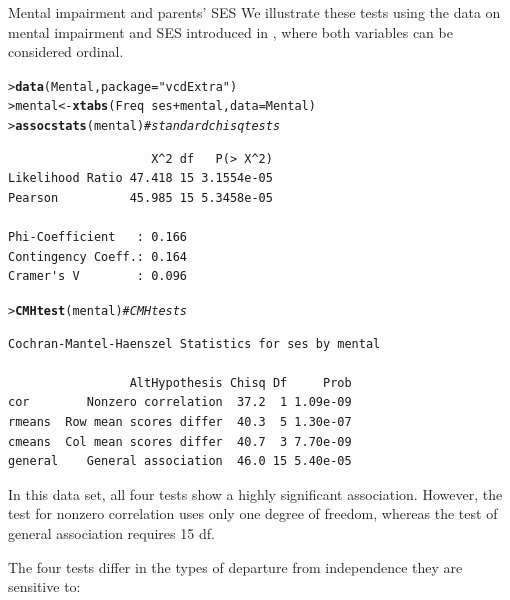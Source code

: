 \documentclass[10pt,krantz2]{krantz}\usepackage[]{graphicx}\usepackage[]{color}
\makeatletter
\newcommand{\hlstr}[1]{\textcolor[rgb]{0.192,0.494,0.8}{#1}}%
\newcommand{\hlcom}[1]{\textcolor[rgb]{0.678,0.584,0.686}{\textit{#1}}}%
\newcommand{\hlopt}[1]{\textcolor[rgb]{0,0,0}{#1}}%
\newcommand{\hlstd}[1]{\textcolor[rgb]{0.345,0.345,0.345}{#1}}%
\newcommand{\hlkwb}[1]{\textcolor[rgb]{0.69,0.353,0.396}{#1}}%
\newcommand{\hlkwc}[1]{\textcolor[rgb]{0.333,0.667,0.333}{#1}}%
\newcommand{\hlkwd}[1]{\textcolor[rgb]{0.737,0.353,0.396}{\textbf{#1}}}%
\newenvironment{kframe}{%
 \def\at@end@of@kframe{}%
 \ifinner\ifhmode%
  \def\at@end@of@kframe{\end{minipage}}%
  \begin{minipage}{\columnwidth}%
 \fi\fi%
 \def\FrameCommand##1{\hskip\@totalleftmargin \hskip-\fboxsep
 \colorbox{shadecolor}{##1}\hskip-\fboxsep
     \hskip-\linewidth \hskip-\@totalleftmargin \hskip\columnwidth}%
 \MakeFramed {\advance\hsize-\width
   \@totalleftmargin\z@ \linewidth\hsize
   \@setminipage}}%
 {\par\unskip\endMakeFramed%
 \at@end@of@kframe}
\newenvironment{knitrout}{}{} %
\renewenvironment{knitrout}{\small\renewcommand{\baselinestretch}{.85}}{} %
\makeatother
\begin{document}
\begin{Example}[mental2]{Mental impairment and parents' SES}
We illustrate these tests using the data on mental impairment and SES
introduced in , where both variables can be considered ordinal.
\begin{knitrout}
\color{fgcolor}\begin{kframe}
\begin{alltt}
\hlstd{> }\hlkwd{data}\hlstd{(Mental,} \hlkwc{package}\hlstd{=}\hlstr{"vcdExtra"}\hlstd{)}
\hlstd{> }\hlstd{mental} \hlkwb{<-} \hlkwd{xtabs}\hlstd{(Freq} \hlopt{~} \hlstd{ses} \hlopt{+} \hlstd{mental,} \hlkwc{data} \hlstd{= Mental)}
\hlstd{> }\hlkwd{assocstats}\hlstd{(mental)}    \hlcom{# standard chisq tests}
\end{alltt}
\begin{verbatim}
                    X^2 df   P(> X^2)
Likelihood Ratio 47.418 15 3.1554e-05
Pearson          45.985 15 5.3458e-05

Phi-Coefficient   : 0.166 
Contingency Coeff.: 0.164 
Cramer's V        : 0.096 
\end{verbatim}
\begin{alltt}
\hlstd{> }\hlkwd{CMHtest}\hlstd{(mental)}       \hlcom{# CMH tests}
\end{alltt}
\begin{verbatim}
Cochran-Mantel-Haenszel Statistics for ses by mental 

                 AltHypothesis Chisq Df     Prob
cor        Nonzero correlation  37.2  1 1.09e-09
rmeans  Row mean scores differ  40.3  5 1.30e-07
cmeans  Col mean scores differ  40.7  3 7.70e-09
general    General association  46.0 15 5.40e-05
\end{verbatim}
\end{kframe}
\end{knitrout}
In this data set, all four tests show a highly significant association.
However, the  test for nonzero correlation uses only one
degree of freedom, whereas the test of general association requires
15 df.
\end{Example}

The four tests differ in the types of departure from
independence they are sensitive to:
\end{document}
